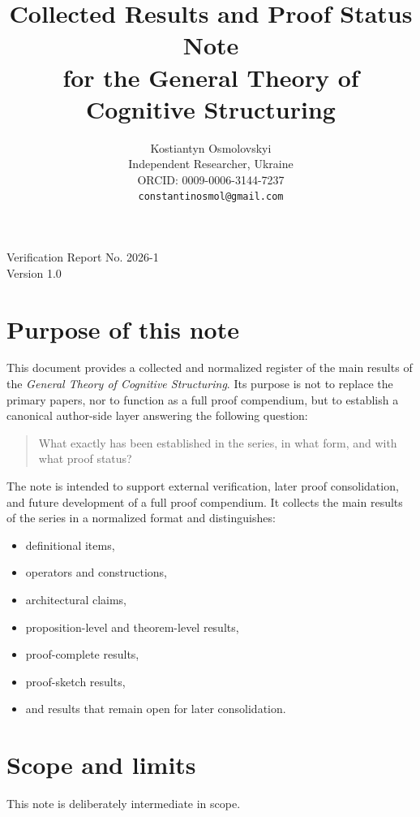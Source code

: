 \documentclass[12pt]{article}
\title{Collected Results and Proof Status Note\\
	\small for the General Theory of Cognitive Structuring}
\author{
	Kostiantyn Osmolovskyi\\
	\small Independent Researcher, Ukraine\\
	\small ORCID: 0009-0006-3144-7237\\
	\small \texttt{constantinosmol@gmail.com}
}
\date{}
\begin{document}
	\maketitle

\begin{center}
	\small
	Verification Report No. 2026-1\\
	Version 1.0
\end{center}

\vspace{0.5em}	
	
	\section{Purpose of this note}
	
	This document provides a collected and normalized register of the main results of the
	\emph{General Theory of Cognitive Structuring}. Its purpose is not to replace the primary
	papers, nor to function as a full proof compendium, but to establish a canonical author-side layer answering the following question:
	
	\begin{quote}
		What exactly has been established in the series, in what form, and with what proof status?
	\end{quote}
	
	The note is intended to support external verification, later proof consolidation, and
	future development of a full proof compendium. It collects the main results of the series in a normalized format and distinguishes:
	\begin{itemize}[leftmargin=2em]
		\item definitional items,
		\item operators and constructions,
		\item architectural claims,
		\item proposition-level and theorem-level results,
		\item proof-complete results,
		\item proof-sketch results,
		\item and results that remain open for later consolidation.
	\end{itemize}
	
	\section{Scope and limits}
	
	This note is deliberately intermediate in scope.
	
\end{document}
